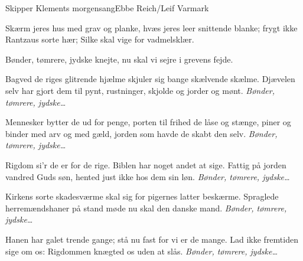 \begin{sang}{Skipper Klements morgensang}{Ebbe Reich/Leif Varmark}

\begin{vers}
Skærm jeres hus med grav og planke,
hvæs jeres leer snittende blanke;
frygt ikke Rantzaus sorte hær;
Silke skal vige for vadmelsklær.
\end{vers}

\begin{omkvaed}[b]
Bønder, tømrere, jydske knejte,
nu skal vi sejre i grevens fejde.
\end{omkvaed}

\begin{vers}
Bagved de riges glitrende hjælme
skjuler sig bange skælvende skælme.
Djævelen selv har gjort dem til pynt,
rustninger, skjolde og jorder og mønt.
\emph{Bønder, tømrere, jydske\dots}
\end{vers}

\begin{vers}
Mennesker bytter de ud for penge,
porten til frihed de låse og stænge,
piner og binder med arv og med gæld,
jorden som havde de skabt den selv.
\emph{Bønder, tømrere, jydske\dots}
\end{vers}
\begin{vers}
Rigdom si'r de er for de rige.
Biblen har noget andet at sige.
Fattig på jorden vandred Guds søn,
hented just ikke hos dem sin løn.
\emph{Bønder, tømrere, jydske\dots}
\end{vers}

\begin{vers}
Kirkens sorte skadesværme
skal sig for pigernes latter beskærme.
Spraglede herremændshaner på stand
møde nu skal den danske mand.
\emph{Bønder, tømrere, jydske\dots}
\end{vers}

\begin{vers}
Hanen har galet trende gange;
stå nu fast for vi er de mange.
Lad ikke fremtiden sige om os:
Rigdommen knægted os uden at slås.
\emph{Bønder, tømrere, jydske\dots}
\end{vers}
\laps
\end{sang}